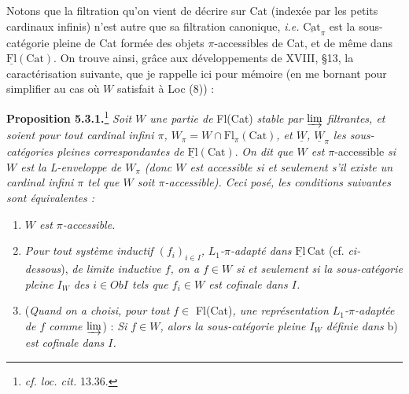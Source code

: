 \documentclass[11pt]{article}
\newcommand{\printedpage}[1]{\marginpar{\footnotesize p.~#1}}
\newcommand{\msp}[1]{\marginpar{\footnotesize [#1]}}
\newcommand{\uFl}{\underline{\mathrm{Fl}}}
\newcommand{\uCat}{\underline{\mathrm{Cat}}}
\begin{document}
\msp{page 76}
Notons que la filtration qu'on vient de décrire sur Cat (indexée par les petits cardinaux infinis) n'est autre que sa filtration canonique, \textit{i.e.} $\uCat_\pi$ est la sous-catégorie pleine de Cat formée des objets $\pi$-accessibles de Cat, et de même dans $\uFl(\mathrm{Cat})$. On trouve ainsi, grâce aux développements de XVIII, §13, la caractérisation suivante, que je rappelle ici pour mémoire (en me bornant pour simplifier au cas où $W$ satisfait à Loc (8)) :

\textbf{Proposition 5.3.1.}\footnote[38]{\textit{cf. loc. cit.} 13.36.} \textit{Soit $W$ une partie de} Fl(Cat) \textit{stable par $\varinjlim$ filtrantes, et soient pour tout cardinal infini $\pi$, $W_\pi = W \cap \mathrm{Fl}_\pi(\mathrm{Cat})$, et $\underline{W}$, $\underline{W}_\pi$ les sous-catégories pleines correspondantes de} $\uFl(\mathrm{Cat})$. \textit{On dit que $W$ est} $\pi$-accessible \textit{si $W$ est la L-enveloppe de $W_\pi$ (donc $W$ est accessible si et seulement s'il existe un cardinal infini $\pi$ tel que $W$ soit $\pi$-accessible). Ceci posé, les conditions suivantes sont équivalentes :}

\printedpage{42}

\begin{enumerate}[label={}]
\item[a)] \textit{$W$ est $\pi$-accessible.}
\item[b)] \textit{Pour tout système inductif $(f_i)_{i\in I}$,}
\msp{page 77}
\textit{$L_1$-$\pi$-adapté dans} $\uFl\,\mathrm{Cat}$ (cf. \textit{ci-dessous}), \textit{de limite inductive $f$, on a $f \in W$ si et seulement si la sous-catégorie pleine $I_W$ des $i \in \mathit{Ob}I$ tels que $f_i \in W$ est cofinale dans $I$.}
\item[b$'$)] (\textit{Quand on a choisi, pour tout $f \in$} Fl(Cat)\textit{, une représentation $L_1$-$\pi$-adaptée de $f$ comme $\varinjlim$}) : \textit{Si $f \in W$, alors la sous-catégorie pleine $I_W$ définie dans} b) \textit{est cofinale dans $I$.}
\end{enumerate}
\end{document}
